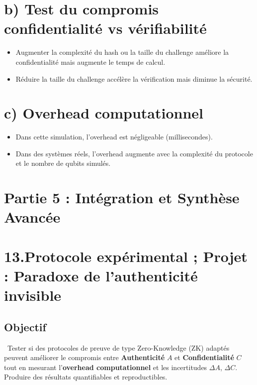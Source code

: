 \documentclass[12pt,a4paper]{report}
\begin{document}
{	\section*{b) Test du compromis confidentialité vs vérifiabilité}
	\begin{itemize}
		\item Augmenter la complexité du hash ou la taille du challenge améliore la confidentialité mais augmente le temps de calcul.
		\item Réduire la taille du challenge accélère la vérification mais diminue la sécurité.
	\end{itemize}
	
	\section*{c) Overhead computationnel}
	\begin{itemize}
		\item Dans cette simulation, l'overhead est négligeable (millisecondes).
		\item Dans des systèmes réels, l'overhead augmente avec la complexité du protocole et le nombre de qubits simulés.
	\end{itemize}
	\section*{Partie 5 : Intégration et Synthèse Avancée}
	\section*{13.Protocole expérimental ; Projet : Paradoxe de l’authenticité invisible}
	
	\subsection*{Objectif}\
	Tester si des protocoles de preuve de type Zero-Knowledge (ZK) adaptés peuvent améliorer le compromis entre \textbf{Authenticité} $A$ et \textbf{Confidentialité} $C$ tout en mesurant l’\textbf{overhead computationnel} et les incertitudes $\Delta A$, $\Delta C$. Produire des résultats quantifiables et reproductibles.
	
}
\end{document}
